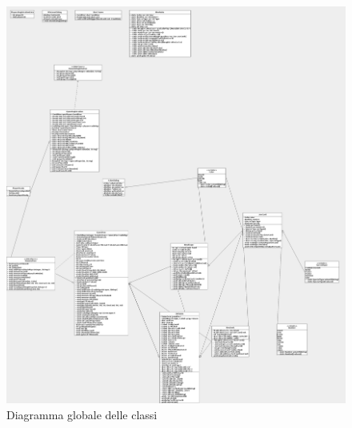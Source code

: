 \documentclass[10pt,a4paper]{article}
\begin{document}
\begin{figure}[H]
\begin{center}
\includegraphics[width=16cm, keepaspectratio]{unogame-sd.png}
\caption{Diagramma globale delle classi}
\end{center}
\end{figure}
\end{document}
